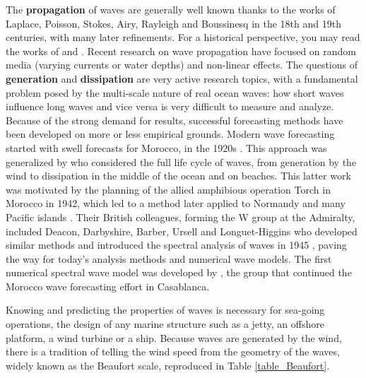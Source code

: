The \textbf{propagation} of waves are generally well known thanks to the works of Laplace, Poisson, Stokes, Airy, Rayleigh and Boussinesq in 
the 18th and 19th centuries, with many later refinements. For a historical perspective, you may read the works of  \cite{Darrigol2003} and \cite{Craik2004}. Recent research on wave propagation have focused on random media (varying currents or water depths) and non-linear effects. The questions of  \textbf{generation} and \textbf{dissipation} are very active
research topics, with a fundamental problem posed by the multi-scale nature of real ocean waves: how short waves influence long waves and vice versa is 
very difficult to measure and analyze. Because of the strong demand for results, successful forecasting methods have been developed on more or less empirical grounds. 
Modern wave forecasting started with swell forecasts
for Morocco, in the 1920s \citep{Gain1918,Montagne1922}. This approach was generalized by 
\cite{Sverdrup&Munk1947} who considered the full life cycle of waves, from generation by the wind to dissipation 
in the middle of the ocean and on beaches. This latter work was 
motivated by the planning of the allied amphibious operation Torch in Morocco in 1942, which led to a method later applied to Normandy 
and many Pacific islands \citep{Bates1949}. Their British colleagues, forming the W group at the Admiralty, included Deacon, Darbyshire, Barber, Ursell and Longuet-Higgins  
who developed similar methods and introduced the spectral analysis of waves in 1945 \citep{Ursell1999}, paving the way for today's analysis methods and numerical wave models. The first numerical spectral wave model was developed by \cite{Gelci&al.1957}, the group that continued the Morocco wave forecasting effort in Casablanca.


Knowing and predicting the properties of waves is necessary for sea-going operations, the design of any marine structure such as 
a jetty, an offshore platform, a wind turbine or a ship. Because waves are generated by the wind, there is a tradition of telling the wind speed from the geometry of the waves, widely known as the Beaufort scale, reproduced in Table \ref{table_Beaufort}. 

